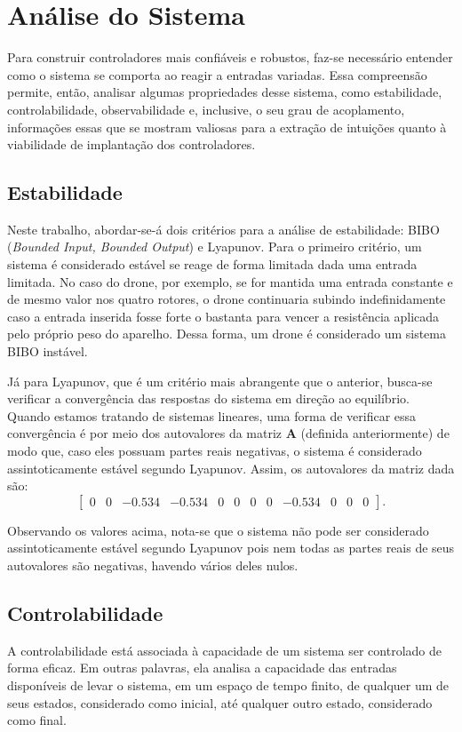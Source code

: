 \section{Análise do Sistema}
Para construir controladores mais confiáveis e robustos, faz-se necessário entender como o sistema se comporta ao 
reagir a entradas variadas. Essa compreensão permite, então, analisar algumas propriedades desse sistema, como 
estabilidade, controlabilidade, observabilidade e, inclusive, o seu grau de acoplamento, informações essas 
que se mostram valiosas para a extração de intuições quanto à viabilidade de implantação dos controladores.

\subsection{Estabilidade}
Neste trabalho, abordar-se-á dois critérios para a análise de estabilidade: BIBO (\textit{Bounded Input, Bounded 
Output}) e Lyapunov. Para o primeiro critério, 
um sistema é considerado estável se reage de forma limitada dada uma entrada limitada. No caso do drone, por exemplo, 
se for mantida uma entrada constante e de mesmo valor nos quatro rotores, o drone continuaria subindo indefinidamente 
caso a entrada inserida fosse forte o bastanta para vencer a resistência aplicada pelo próprio peso do aparelho. Dessa 
forma, um drone é considerado um sistema BIBO instável.

Já para Lyapunov, que é um critério mais abrangente que o anterior, busca-se verificar a convergência das respostas 
do sistema em direção ao equilíbrio. Quando estamos tratando de sistemas lineares, uma forma de verificar essa 
convergência é por meio dos autovalores da matriz $\mathbf{A}$ (definida anteriormente) de modo que, caso eles possuam 
partes reais negativas, o sistema é considerado assintoticamente estável segundo Lyapunov. Assim, os autovalores 
da matriz dada são:
\begin{equation*}
    \left[\begin{array}{cccccccccccc}
        0 & 0 & -0.534 & -0.534 & 0 & 0 & 0 & 0 & -0.534 & 0 & 0 & 0
    \end{array}\right].
\end{equation*}

Observando os valores acima, nota-se que o sistema não pode ser considerado assintoticamente estável segundo Lyapunov 
pois nem todas as partes reais de seus autovalores são negativas, havendo vários deles nulos.

\subsection{Controlabilidade}
A controlabilidade está associada à capacidade de um sistema ser controlado de forma eficaz. Em outras palavras, ela 
analisa a capacidade das entradas disponíveis de levar o sistema, em um espaço de tempo finito, de qualquer um de seus 
estados, considerado como inicial, até qualquer outro estado, considerado como final.

